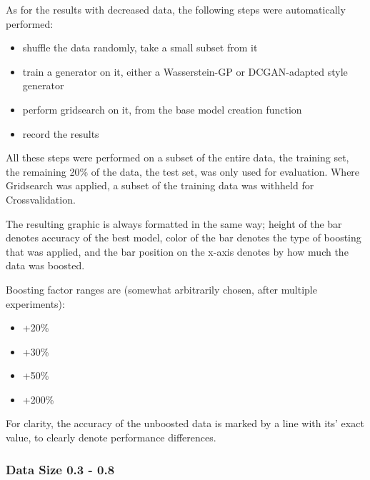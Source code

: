 As for the results with decreased data, the following steps were automatically performed: 

\begin{itemize}
	\item shuffle the data randomly, take a small subset from it
	\item train a generator on it, either a Wasserstein-GP or DCGAN-adapted style generator
	\item perform gridsearch on it, from the base model creation function
	\item record the results
\end{itemize}

All these steps were performed on a subset of the entire data, the training set, the remaining 20\% of the data, the test set, was only used for evaluation.
Where Gridsearch was applied, a subset of the training data was withheld for Crossvalidation.

The resulting graphic is always formatted in the same way; height of the bar denotes accuracy of the best model, color of the bar denotes the type of boosting that was applied, 
and the bar position on the x-axis denotes by how much the data was boosted. 

Boosting factor ranges are (somewhat arbitrarily chosen, after multiple experiments):

\begin{itemize}
	\item +20\%
	\item +30\%
	\item +50\%
	\item +200\%
	
\end{itemize}

For clarity, the accuracy of the unboosted data is marked by a line with its' exact value, to clearly denote performance differences.

\clearpage

\subsubsection{Data Size 0.3 - 0.8}




